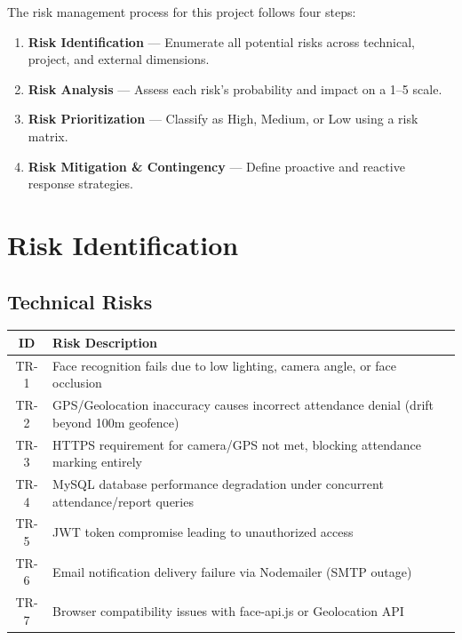 \documentclass[12pt,a4paper]{article}
\begin{document}
The risk management process for this project follows four steps:
\begin{enumerate}[noitemsep, label=\roman*)]
    \item \textbf{Risk Identification} --- Enumerate all potential risks across technical, project, and external dimensions.
    \item \textbf{Risk Analysis} --- Assess each risk's probability and impact on a 1--5 scale.
    \item \textbf{Risk Prioritization} --- Classify as High, Medium, or Low using a risk matrix.
    \item \textbf{Risk Mitigation \& Contingency} --- Define proactive and reactive response strategies.
\end{enumerate}

\section{Risk Identification}

\subsection{Technical Risks}

\begin{center}
\begin{tabular}{c l}
\toprule
\textbf{ID} & \textbf{Risk Description} \\
\midrule
TR-1 & Face recognition fails due to low lighting, camera angle, or face occlusion \\
TR-2 & GPS/Geolocation inaccuracy causes incorrect attendance denial (drift beyond 100m geofence) \\
TR-3 & HTTPS requirement for camera/GPS not met, blocking attendance marking entirely \\
TR-4 & MySQL database performance degradation under concurrent attendance/report queries \\
TR-5 & JWT token compromise leading to unauthorized access \\
TR-6 & Email notification delivery failure via Nodemailer (SMTP outage) \\
TR-7 & Browser compatibility issues with face-api.js or Geolocation API \\
\bottomrule
\end{tabular}
\end{center}
\end{document}
